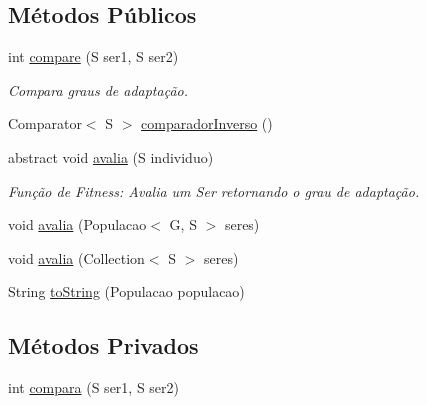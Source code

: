 \subsection*{Métodos Públicos}
\begin{DoxyCompactItemize}
\item 
int \hyperlink{classic_1_1populacional_1_1_ambiente_3_01_g_01extends_01_number_00_01_s_01extends_01_ser_3_01_g_01_4_01_4_a6c2cb1321f4b8193c73795a63dd7b6b6}{compare} (S ser1, S ser2)
\begin{DoxyCompactList}\small\item\em Compara graus de adaptação. \end{DoxyCompactList}\item 
Comparator$<$ S $>$ \hyperlink{classic_1_1populacional_1_1_ambiente_3_01_g_01extends_01_number_00_01_s_01extends_01_ser_3_01_g_01_4_01_4_af5f2d9cb2f272b57dc9df40fe28eaa23}{comparador\-Inverso} ()
\item 
abstract void \hyperlink{classic_1_1populacional_1_1_ambiente_3_01_g_01extends_01_number_00_01_s_01extends_01_ser_3_01_g_01_4_01_4_a3c92882c3d2b737929b71252bb7547a6}{avalia} (S individuo)
\begin{DoxyCompactList}\small\item\em Função de Fitness\-: Avalia um {\ttfamily Ser} retornando o grau de adaptação. \end{DoxyCompactList}\item 
void \hyperlink{classic_1_1populacional_1_1_ambiente_3_01_g_01extends_01_number_00_01_s_01extends_01_ser_3_01_g_01_4_01_4_a285d0ff2ed86603ad7e0d330619b802c}{avalia} (Populacao$<$ G, S $>$ seres)
\item 
void \hyperlink{classic_1_1populacional_1_1_ambiente_3_01_g_01extends_01_number_00_01_s_01extends_01_ser_3_01_g_01_4_01_4_af55eb2495ac299158dd94fd3bb12bb8b}{avalia} (Collection$<$ S $>$ seres)
\item 
String \hyperlink{classic_1_1populacional_1_1_ambiente_3_01_g_01extends_01_number_00_01_s_01extends_01_ser_3_01_g_01_4_01_4_a983291994cef2fc984dc1ccd5a1e216a}{to\-String} (Populacao populacao)
\end{DoxyCompactItemize}
\subsection*{Métodos Privados}
\begin{DoxyCompactItemize}
\item 
int \hyperlink{classic_1_1populacional_1_1_ambiente_3_01_g_01extends_01_number_00_01_s_01extends_01_ser_3_01_g_01_4_01_4_ac655429478451f27f8140ac57f1e64fe}{compara} (S ser1, S ser2)
\end{DoxyCompactItemize}


